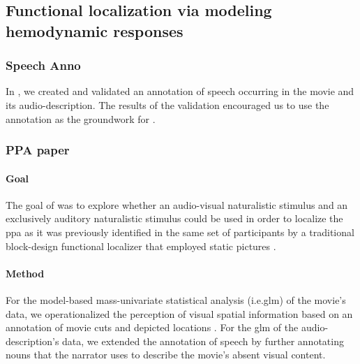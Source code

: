 \subsection{Functional localization via modeling hemodynamic responses}


\subsubsection{Speech Anno}


In \citet{haeusler2021speechanno}, we created and validated an annotation of
speech occurring in the movie and its audio-description.
The results of the validation encouraged us to use the annotation as the
groundwork for \citep{haeusler2022processing}.

\subsubsection{PPA paper}




\paragraph{Goal}

The goal of \citet{haeusler2022processing} was to explore whether an
audio-visual naturalistic stimulus and an exclusively auditory naturalistic
stimulus could be used in order to localize the \ac{ppa} as it was previously
identified in the same set of participants by a traditional block-design
functional localizer that employed static pictures
\citep{sengupta2016extension}.


\paragraph{Method}

For the model-based mass-univariate statistical analysis (i.e.\ac{glm}) of the
movie's data, we operationalized the perception of visual spatial information
based on an annotation of movie cuts and depicted locations
\citep{haeusler2016cutanno}.
For the \ac{glm} of the audio-description's data, we extended the annotation of
speech \citep{haeusler2021speechanno} by further annotating nouns that the
narrator uses to describe the movie's absent visual content.


